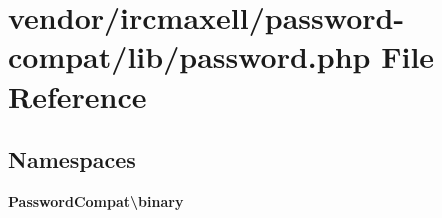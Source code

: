 \section{vendor/ircmaxell/password-\/compat/lib/password.php File Reference}
\label{ircmaxell_2password-compat_2lib_2password_8php}
\subsection*{Namespaces}
\begin{DoxyCompactItemize}
\item 
 {\bf Password\+Compat\textbackslash{}binary}
\end{DoxyCompactItemize}
